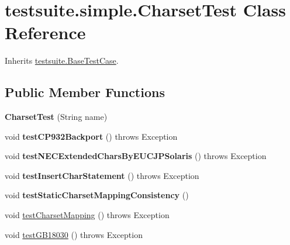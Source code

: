 \hypertarget{classtestsuite_1_1simple_1_1_charset_test}{}\section{testsuite.\+simple.\+Charset\+Test Class Reference}
\label{classtestsuite_1_1simple_1_1_charset_test}


Inherits \mbox{\hyperlink{classtestsuite_1_1_base_test_case}{testsuite.\+Base\+Test\+Case}}.

\subsection*{Public Member Functions}
\begin{DoxyCompactItemize}
\item 
\mbox{\label{classtestsuite_1_1simple_1_1_charset_test_a6c41126f4f1e57b55d853cf3d7c55155}} 
{\bfseries Charset\+Test} (String name)
\item 
\mbox{\label{classtestsuite_1_1simple_1_1_charset_test_a7c62b0525cd9efee8029643a749d3c18}} 
void {\bfseries test\+C\+P932\+Backport} ()  throws Exception 
\item 
\mbox{\label{classtestsuite_1_1simple_1_1_charset_test_a628f2a4dec5304244c9b100cc0fd2c4a}} 
void {\bfseries test\+N\+E\+C\+Extended\+Chars\+By\+E\+U\+C\+J\+P\+Solaris} ()  throws Exception 
\item 
\mbox{\label{classtestsuite_1_1simple_1_1_charset_test_abc30bd84bed2b0038ddd200e11c29a76}} 
void {\bfseries test\+Insert\+Char\+Statement} ()  throws Exception 
\item 
\mbox{\label{classtestsuite_1_1simple_1_1_charset_test_a055fafb213fa7c790eff0c58414c9579}} 
void {\bfseries test\+Static\+Charset\+Mapping\+Consistency} ()
\item 
void \mbox{\hyperlink{classtestsuite_1_1simple_1_1_charset_test_ace6046bed9bc3e29734e98003258fd58}{test\+Charset\+Mapping}} ()  throws Exception 
\item 
void \mbox{\hyperlink{classtestsuite_1_1simple_1_1_charset_test_a6fa2cb7372e754c7a783af4cba1cbd17}{test\+G\+B18030}} ()  throws Exception 
\end{DoxyCompactItemize}
